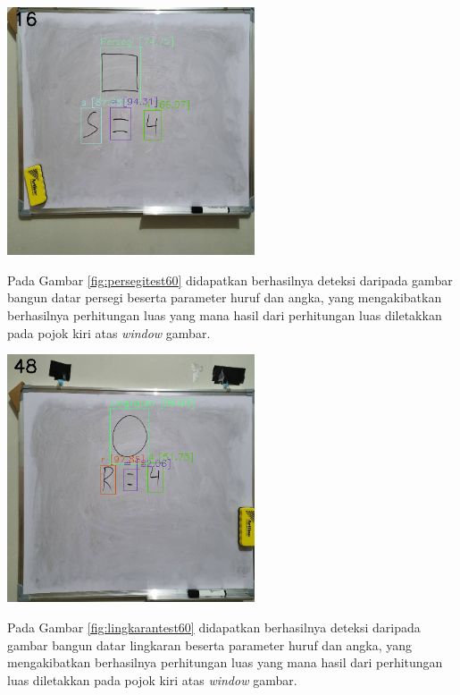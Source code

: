 \begin{center}
	\includegraphics[width=0.55\textwidth]{gambar/pers60hasil.png}
	\label{fig:persegitest60}
\end{center}
Pada Gambar \ref{fig:persegitest60} didapatkan berhasilnya deteksi daripada gambar bangun datar persegi beserta parameter huruf dan angka, yang mengakibatkan berhasilnya perhitungan luas yang mana hasil dari perhitungan luas diletakkan pada pojok kiri atas \textit{window} gambar.

\begin{center}
	\includegraphics[width=0.55\textwidth]{gambar/ling60hasil.png}
	\label{fig:lingkarantest60}
\end{center}
Pada Gambar \ref{fig:lingkarantest60} didapatkan berhasilnya deteksi daripada gambar bangun datar lingkaran beserta parameter huruf dan angka, yang mengakibatkan berhasilnya perhitungan luas yang mana hasil dari perhitungan luas diletakkan pada pojok kiri atas \textit{window} gambar.

